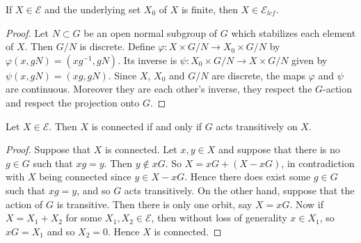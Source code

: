 \begin{lemma}
If $X \in \mathscr{E}$ and the underlying set $X_0$ of $X$ is finite, then $X \in \mathscr{E}_{lcf}$.
\end{lemma}
\begin{proof}
Let $N \subset G$ be an open normal subgroup of $G$ which stabilizes each element of $X$. Then $G/N$ is discrete. Define $\varphi : X \times G/N \to X_0 \times G/N$ by $\varphi(x,gN) = (xg^{-1},gN)$. Its inverse is $\psi : X_0 \times G/N \to X \times G/N$ given by $\psi(x,gN) = (xg,gN)$. Since $X$, $X_0$ and $G/N$ are discrete, the maps $\varphi$ and $\psi$ are continuous. Moreover they are each other's inverse, they respect the $G$-action and respect the projection onto $G$.
\end{proof}

\begin{lemma}
\label{lemma: X is connected if and only if G acts transitively}
Let $X \in \mathscr{E}$. Then $X$ is connected if and only if $G$ acts transitively on $X$.
\end{lemma}
\begin{proof}
Suppose that $X$ is connected. Let $x,y \in X$ and suppose that there is no $g \in G$ such that $xg = y$. Then $y \not\in xG$. So $X = xG + (X - xG)$, in contradiction with $X$ being connected since $y \in X - xG$. Hence there does exist some $g \in G$ such that $xg = y$, and so $G$ acts transitively. On the other hand, suppose that the action of $G$ is transitive. Then there is only one orbit, say $X = xG$. Now if $X = X_1 + X_2$ for some $X_1,X_2 \in \mathscr{E}$, then without loss of generality $x \in X_1$, so $xG = X_1$ and so $X_2 = 0$. Hence $X$ is connected.
\end{proof}


